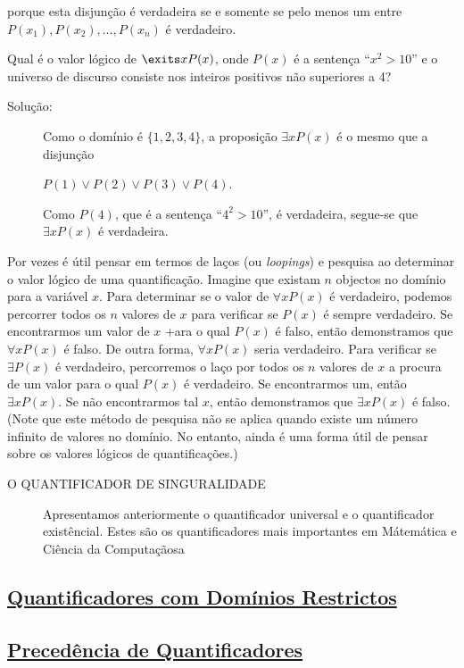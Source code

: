 porque esta disjunção é verdadeira se e somente se pelo menos um entre $P(x_1),
P(x_2), \ldots, P(x_n)$ é verdadeiro.

\begin{exmp}
\label{exem140}
Qual é o valor lógico de $\exits xP(x)$, onde $P(x)$ é a sentença ``$x^2 > 10$''
e o universo de discurso consiste nos inteiros positivos não superiores a 4?
\begin{description}
\item[Solução:]Como o domínio é $\{1,2,3,4\}$, a proposição $\exists xP(x)$ é o
mesmo que a disjunção

\begin{center}
$P(1) \lor P(2) \lor P(3) \lor P(4)$.
\end{center}

Como $P(4)$, que é a sentença ``$4^2 > 10$'', é verdadeira, segue-se que
$\exists xP(x)$ é verdadeira.
\end{description}
\end{exmp}

Por vezes é útil pensar em termos de laços (ou \emph{loopings}) e pesquisa ao
determinar o valor lógico de uma quantificação. Imagine que existam $n$
objectos no domínio para a variável $x$. Para determinar se o valor de $\forall
xP(x)$ é verdadeiro, podemos percorrer todos os $n$ valores de $x$ para
verificar se $P(x)$ é sempre verdadeiro. Se encontrarmos um valor de $x$ +ara o
qual $P(x)$ é falso, então demonstramos que $\forall xP(x)$ é falso. De outra
forma, $\forall xP(x)$ seria verdadeiro. Para verificar se $\exists P(x)$ é
verdadeiro, percorremos o laço por todos os $n$ valores de $x$ a procura de um
valor para o qual $P(x)$ é verdadeiro. Se encontrarmos um, então $\exists
xP(x)$. Se não encontrarmos tal $x$, então demonstramos que $\exists xP(x)$ é
falso. (Note que este método de pesquisa não se aplica quando existe um número
infinito de valores no domínio. No entanto, ainda é uma forma útil de pensar
sobre os valores lógicos de quantificações.)

\begin{description}
\item[O QUANTIFICADOR DE SINGURALIDADE] Apresentamos anteriormente o
quantificador universal e o quantificador existêncial. Estes são os
quantificadores mais importantes em Mátemática e Ciência da Computaçãosa 
\end{description}

\subsection*{\underline{Quantificadores com Domínios
Restrictos}} \subsection*{\underline{Precedência de Quantificadores}}
